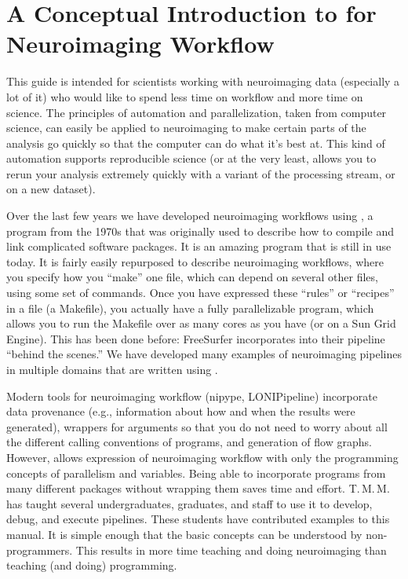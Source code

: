 \chapter[Introduction to \maken{}]{A Conceptual Introduction to \maken{} for Neuroimaging Workflow}
\label{chap:intro}
	
This guide is intended for scientists working with neuroimaging data (especially a lot of it) who would like to spend less time on workflow and more time on science. The principles of automation and parallelization, taken from computer science, can easily be applied to neuroimaging to make certain parts of the analysis go quickly so that the computer can do what it's best at. This kind of automation supports reproducible science (or at the very least, allows you to rerun your analysis extremely quickly with a variant of the processing stream, or on a new dataset).
	
Over the last few years we have developed neuroimaging workflows using \maken, a program from the 1970s that was originally used to describe how to compile and link complicated software packages. It is an amazing program that is still in use today. It is fairly easily repurposed to describe neuroimaging workflows, where you specify how you ``make'' one file, which can depend on several other files, using some set of commands. Once you have expressed these ``rules'' or ``recipes'' in a file (a Makefile), you actually have a fully parallelizable program, which allows you to run the Makefile over as many cores as you have (or on a Sun Grid Engine). This has been done before: FreeSurfer incorporates \maken{} into their pipeline ``behind the scenes.''  We have developed many examples of neuroimaging pipelines in multiple domains that are written using \maken{}.
	
Modern tools for neuroimaging workflow (nipype, LONIPipeline) incorporate data provenance (e.g., information about how and when the results were generated), wrappers for arguments so that you do not need to worry about all the different calling conventions of programs, and generation of flow graphs. However, \maken{} allows expression of neuroimaging workflow with only the programming concepts of parallelism and variables. Being able to incorporate programs from many different packages without wrapping them saves time and effort.  T.\,M.\,M. has taught several undergraduates, graduates, and staff to use it to develop, debug, and execute pipelines. These students have contributed examples to this manual. It is simple enough that the basic concepts can be understood by non-programmers. This results in more time teaching and doing neuroimaging than teaching (and doing) programming.
	
